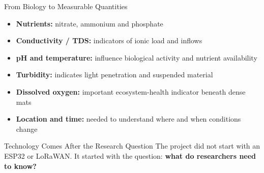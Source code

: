 \begin{frame}{From Biology to Measurable Quantities}
\begin{itemize}
    \item \textbf{Nutrients:} nitrate, ammonium and phosphate
    \item \textbf{Conductivity / TDS:} indicators of ionic load and inflows
    \item \textbf{pH and temperature:} influence biological activity and nutrient availability
    \item \textbf{Turbidity:} indicates light penetration and suspended material
    \item \textbf{Dissolved oxygen:} important ecosystem-health indicator beneath dense mats
    \item \textbf{Location and time:} needed to understand where and when conditions change
\end{itemize}
\begin{alertblock}{Technology Comes After the Research Question}
The project did not start with an ESP32 or LoRaWAN. It started with the question: \textbf{what do researchers need to know?}
\end{alertblock}
\end{frame}
